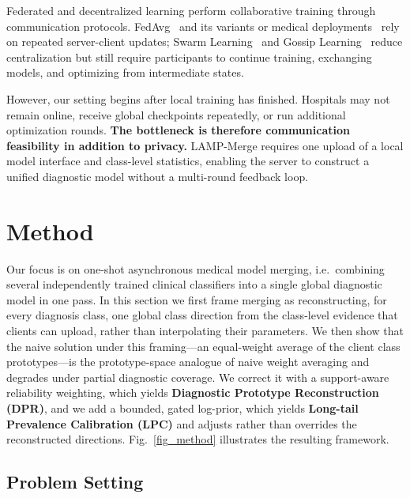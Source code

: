 \documentclass[letterpaper]{article} %
\begin{document}
Federated and decentralized learning perform collaborative training through communication protocols. FedAvg~\cite{pmlr-v54-mcmahan17a} and its variants or medical deployments~\cite{li2020fedprox,karimireddy2020scaffold,li2021fedbn,kaissis_secure_2020,sheller2020federated,rieke2020future,kairouz2021advances} rely on repeated server-client updates; Swarm Learning~\cite{warnat-herresthal_swarm_2021} and Gossip Learning~\cite{hegedhus_gossip_2019} reduce centralization but still require participants to continue training, exchanging models, and optimizing from intermediate states.

However, our setting begins after local training has finished. Hospitals may not remain online, receive global checkpoints repeatedly, or run additional optimization rounds. \textbf{The bottleneck is therefore communication feasibility in addition to privacy.} LAMP-Merge requires one upload of a local model interface and class-level statistics, enabling the server to construct a unified diagnostic model without a multi-round feedback loop.

\section{Method}

Our focus is on one-shot asynchronous medical model merging, i.e.\ combining several independently trained clinical classifiers into a single global diagnostic model in one pass. In this section we first frame merging as reconstructing, for every diagnosis class, one global class direction from the class-level evidence that clients can upload, rather than interpolating their parameters. We then show that the naive solution under this framing---an equal-weight average of the client class prototypes---is the prototype-space analogue of naive weight averaging and degrades under partial diagnostic coverage. We correct it with a support-aware reliability weighting, which yields \textbf{Diagnostic Prototype Reconstruction (DPR)}, and we add a bounded, gated log-prior, which yields \textbf{Long-tail Prevalence Calibration (LPC)} and adjusts rather than overrides the reconstructed directions. Fig.~\ref{fig_method} illustrates the resulting framework.

\subsection{Problem Setting}
\end{document}
